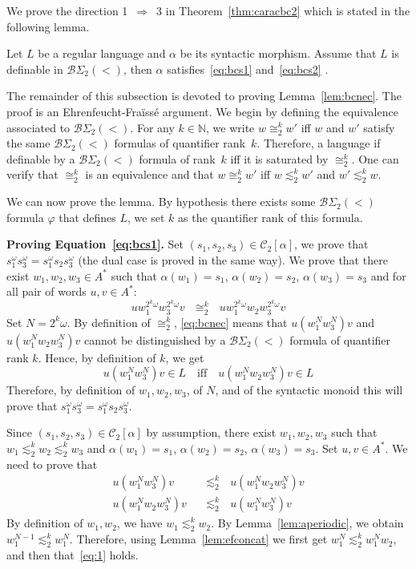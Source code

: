 \documentclass[envcountsame]{llncs}
\newcommand{\efgame}{Ehrenfeucht-Fra\"iss\'e\xspace}
\newcommand\nat{\ensuremath{\mathbb{N}}\xspace}
\newcommand\Cs{\ensuremath{\mathcal{C}}\xspace}
\newcommand\Cstwo{\ensuremath{\Cs_2}\xspace}
\newcommand{\bswd}{\ensuremath{\mathcal{B}\Sigma_{2}(<)}\xspace}
\newcommand\sieq[2]{\ensuremath{\lesssim^{#1}_{#2}}\xspace}
\newcommand\ksieq[1]{\sieq{k}{#1}}
\newcommand\bceq[2]{\ensuremath{\cong^{#1}_{#2}}\xspace}
\newcommand\kbceq[1]{\bceq{k}{#1}}
\begin{document}
We prove the direction 1~$\Rightarrow$~3 in Theorem~\ref{thm:caracbc2}
which is stated in the following lemma.

\begin{lemma} \label{lem:bcnec}
  Let $L$ be a regular language and $\alpha$ be its syntactic
  morphism. Assume that $L$ is definable in \bswd, then $\alpha$
  satisfies~\eqref{eq:bcs1} and~\eqref{eq:bcs2} .
\end{lemma}

The remainder of this subsection is devoted to proving
Lemma~\ref{lem:bcnec}. The proof is an \efgame argument. We begin by
defining the equivalence associated to \bswd. For any $k \in \nat$, we
write $w \kbceq{2} w'$ iff $w$ and $w'$ satisfy the same \bswd
formulas of quantifier rank~$k$. Therefore, a language if definable by
a $\bswd$ formula of rank~$k$ iff it is saturated by $\kbceq{2}$. One
can verify that $\kbceq{2}$ is an equivalence and that $w \kbceq{2}
w'$ iff $w \ksieq{2} w'$ and $w' \ksieq{2} w$.

We can now prove the lemma. By hypothesis there exists some $\bswd$
formula $\varphi$ that defines $L$, we set $k$ as the quantifier rank  
of this formula. 

\medskip
\noindent
{\bf Proving Equation~\eqref{eq:bcs1}.} Set $(s_1,s_2,s_3) \in
\Cstwo[\alpha]$, we prove that $s_1^{\omega}s_3^{\omega} =
s_1^{\omega}s_2s_3^{\omega}$ (the dual case is proved in the same
way). We prove that there exist $w_1,w_2,w_3 \in A^*$ such that
$\alpha(w_1) = s_1$, $\alpha(w_2)=s_2$, $\alpha(w_3)=s_3$ and for all
pair of words $u,v \in A^*$: 
\begin{equation}
  uw_1^{2^k\omega}w_3^{2^k\omega}v ~~~\kbceq{2}~~~
  uw_1^{2^k\omega}w_2w_3^{2^k\omega}v \label{eq:bcnec}
\end{equation}
Set $N=2^k\omega$. By definition of \kbceq{2}, \eqref{eq:bcnec} means that $u (w_1^{N}w_3^{N}) v$ and
$u (w_1^{N}w_2w_3^{N}) v$ cannot be distinguished by a \bswd
formula of quantifier rank $k$. Hence, by definition of $k$, we get
\[
u(w_1^{N}w_3^{N})v \in L \text{~~~iff~~~}
u(w_1^{N}w_2w_3^{N})v \in L
\]
Therefore, by definition of $w_1,w_2,w_3$, of $N$, and of the syntactic monoid
this will prove that $s_1^{\omega}s_3^{\omega} = s_1^{\omega}s_2s_3^{\omega}$.

Since $(s_1,s_2,s_3) \in \Cstwo[\alpha]$ by assumption, there
exist $w_1,w_2,w_3$ such that $w_1 \ksieq{2} w_2 \ksieq{2} w_3$ and
$\alpha(w_1) = s_1$, $\alpha(w_2)=s_2$, $\alpha(w_3)=s_3$. Set $u,v
\in A^*$. We need to prove that
\begin{align}
  \label{eq:1}
  u(w_1^{N}w_3^{N})v & ~~~\ksieq{2}~~~ u(w_1^{N}w_2w_3^{N})v\\
  \label{eq:2}
  u(w_1^{N}w_2w_3^{N})v & ~~~\ksieq{2}~~~ u(w_1^{N}w_3^{N})v
\end{align}
By definition of $w_1,w_2$, we have $w_1
\ksieq{2} w_2$. By Lemma~\ref{lem:aperiodic}, we obtain
$w_1^{N-1} \ksieq{2} w_1^{N}$. Therefore, using 
Lemma~\ref{lem:efconcat} we first get $w_1^N\ksieq{2}w_1^{N}w_2$, and
then that~\eqref{eq:1} holds.
\end{document}
